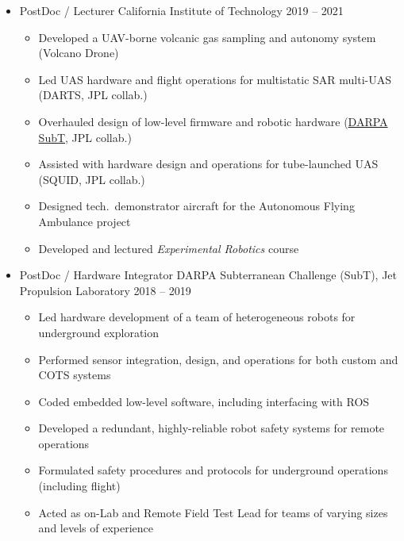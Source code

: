 \documentclass[12pt,letter,sans]{moderncv}
\begin{document}
\begin{itemize}
\item{\cventry
    {}
    {PostDoc / Lecturer}
    {California Institute of Technology}
    {2019 -- 2021}
	{}
	{ 
        \vspace{3pt} 
        \begin{itemize}
			\item Developed a UAV-borne volcanic gas sampling and autonomy system (Volcano Drone)%
            \item Led UAS hardware and flight operations for multistatic SAR multi-UAS (DARTS, JPL collab.) %
            \item Overhauled design of low-level firmware and robotic hardware (\href{https://www.darpa.mil/program/darpa-subterranean-challenge}{DARPA SubT}, JPL collab.)
            \item Assisted with hardware design and operations for tube-launched UAS (SQUID, JPL collab.)
            \item Designed tech.~demonstrator aircraft for the Autonomous Flying Ambulance project %
            \item Developed and lectured \textit{Experimental Robotics} course %
        \end{itemize}
    }
}

\vspace{4pt}

\item{\cventry
    {}
    {PostDoc / Hardware Integrator}
    {DARPA Subterranean Challenge (SubT), Jet Propulsion Laboratory}
    {2018 -- 2019}
    {}
    {  
        \vspace{3pt} 
        \begin{itemize}
            \item Led hardware development of a team of heterogeneous robots for underground exploration
            \item Performed sensor integration, design, and operations for both custom and COTS systems
            \item Coded embedded low-level software, including interfacing with ROS 
            \item Developed a redundant, highly-reliable robot safety systems for remote operations
            \item Formulated safety procedures and protocols for underground operations (including flight) 
            \item Acted as on-Lab and Remote Field Test Lead for teams of varying sizes and levels of experience 
        \end{itemize}
    }
}


\end{itemize}
\end{document}
